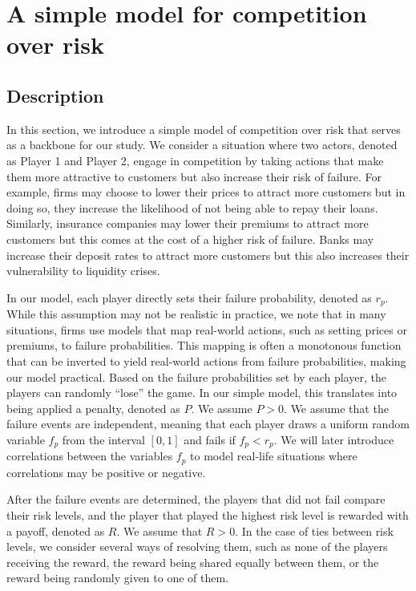 \documentclass[preprint,12pt,authoryear,doubleblind]{elsarticle}
\theoremstyle{definition}
\begin{document}
\section{A simple model for competition over risk}
\label{sec:simplemodel}
\subsection{Description}

In this section, we introduce a simple model of competition over risk that serves as a backbone for our study. We consider a situation where two actors, denoted as Player 1 and Player 2, engage in competition by taking actions that make them more attractive to customers but also increase their risk of failure. For example, firms may choose to lower their prices to attract more customers but in doing so, they increase the likelihood of not being able to repay their loans. Similarly, insurance companies may lower their premiums to attract more customers but this comes at the cost of a higher risk of failure. Banks may increase their deposit rates to attract more customers but this also increases their vulnerability to liquidity crises.

In our model, each player directly sets their failure probability, denoted as $r_p$. While this assumption may not be realistic in practice, we note that in many situations, firms use models that map real-world actions, such as setting prices or premiums, to failure probabilities. This mapping is often a monotonous function that can be inverted to yield real-world actions from failure probabilities, making our model practical.
Based on the failure probabilities set by each player, the players can randomly ``lose'' the game. In our simple model, this translates into being applied a penalty, denoted as $P$. We assume $P>0$. We assume that the failure events are independent, meaning that each player draws a uniform random variable $f_p$ from the interval $[0,1]$ and fails if $f_p < r_p$. We will later introduce correlations between the variables $f_p$ to model real-life situations where correlations may be positive or negative.

After the failure events are determined, the players that did not fail compare their risk levels, and the player that played the highest risk level is rewarded with a payoff, denoted as $R$. We assume that $R > 0$. In the case of ties between risk levels, we consider several ways of resolving them, such as none of the players receiving the reward, the reward being shared equally between them, or the reward being randomly given to one of them.
\end{document}
